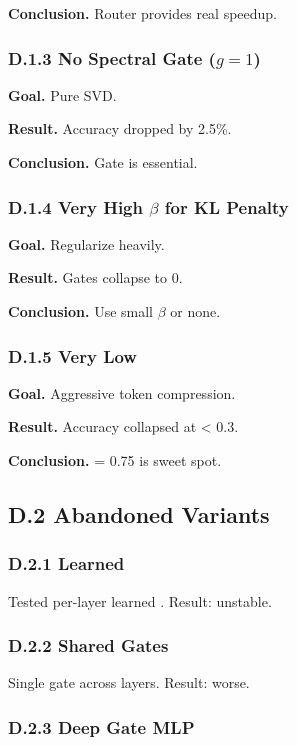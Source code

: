 \textbf{Conclusion.} Router provides real speedup.

\subsubsection{D.1.3 No Spectral Gate ($g=1$)}

\textbf{Goal.} Pure SVD.

\textbf{Result.} Accuracy dropped by 2.5\%.

\textbf{Conclusion.} Gate is essential.

\subsubsection{D.1.4 Very High $\beta$ for KL Penalty}

\textbf{Goal.} Regularize heavily.

\textbf{Result.} Gates collapse to 0.

\textbf{Conclusion.} Use small $\beta$ or none.

\subsubsection{D.1.5 Very Low}

\textbf{Goal.} Aggressive token compression.

\textbf{Result.} Accuracy collapsed at   \textless{} 0.3.

\textbf{Conclusion.}   = 0.75 is sweet spot.

\subsection{D.2 Abandoned Variants}

\subsubsection{D.2.1 Learned}

Tested per-layer learned  . Result: unstable.

\subsubsection{D.2.2 Shared Gates}

Single gate across layers. Result: worse.

\subsubsection{D.2.3 Deep Gate MLP}

